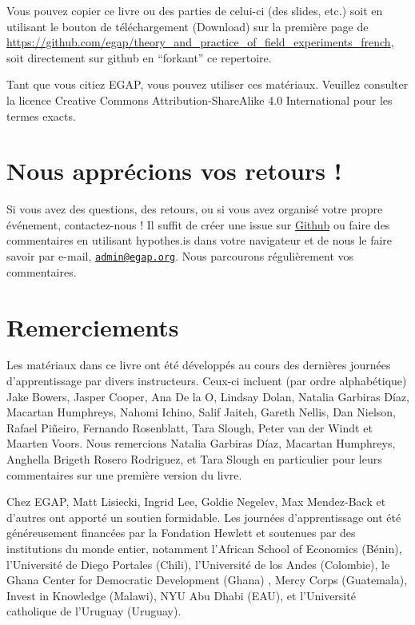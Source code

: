 \documentclass[
  12pt,
]{book}
\begin{document}
Vous pouvez copier ce livre ou des parties de celui-ci (des slides, etc.) soit en utilisant le bouton de téléchargement (Download) sur la première page de \url{https://github.com/egap/theory_and_practice_of_field_experiments_french}, soit directement sur github en ``forkant'' ce repertoire.

Tant que vous citiez EGAP, vous pouvez utiliser ces matériaux. Veuillez consulter la licence Creative Commons Attribution-ShareAlike 4.0 International pour les termes exacts.

\hypertarget{nous-appruxe9cions-vos-retours}{%
\section{Nous apprécions vos retours !}\label{nous-appruxe9cions-vos-retours}}

Si vous avez des questions, des retours, ou si vous avez organisé votre propre événement, contactez-nous !
Il suffit de créer une issue sur \href{https://github.com/egap/theory_and_practice_of_field_experiments_french/issues}{Github} ou faire des commentaires en utilisant hypothes.is dans votre navigateur et de nous le faire savoir par e-mail, \href{mailto:admin@egap.org}{\nolinkurl{admin@egap.org}}. Nous parcourons régulièrement vos commentaires.

\hypertarget{remerciements}{%
\section{Remerciements}\label{remerciements}}

Les matériaux dans ce livre ont été développés au cours des dernières journées d'apprentissage par divers instructeurs.
Ceux-ci incluent (par ordre alphabétique) Jake Bowers, Jasper Cooper, Ana De la O, Lindsay Dolan, Natalia Garbiras Díaz, Macartan Humphreys, Nahomi Ichino, Salif Jaiteh, Gareth Nellis, Dan Nielson, Rafael Piñeiro, Fernando Rosenblatt, Tara Slough, Peter van der Windt et Maarten Voors. Nous remercions Natalia Garbiras Díaz, Macartan Humphreys, Anghella Brigeth Rosero Rodriguez, et Tara Slough en particulier pour leurs commentaires sur une première version du livre.

Chez EGAP, Matt Lisiecki, Ingrid Lee, Goldie Negelev, Max Mendez-Back et d'autres ont apporté un soutien formidable. Les journées d'apprentissage ont été généreusement financées par la Fondation Hewlett et soutenues par des institutions du monde entier, notamment l'African School of Economics (Bénin), l'Université de Diego Portales (Chili), l'Université de los Andes (Colombie), le Ghana Center for Democratic Development (Ghana) , Mercy Corps (Guatemala), Invest in Knowledge (Malawi), NYU Abu Dhabi (EAU), et l'Université catholique de l'Uruguay (Uruguay).
\end{document}
